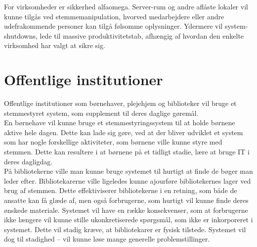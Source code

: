 For virksomheder er sikkerhed alfaomega. Server-rum og andre aflåste lokaler vil kunne tilgås ved stemmemanipulation, hvorved medarbejdere eller andre udefrakommende personer kan tilgå følsomme oplysninger. Ydermere vil system-shutdowns, lede til massive produktivitetstab, afhængig af hvordan den enkelte virksomhed har valgt at sikre sig. 

\section{Offentlige institutioner} 
Offentlige institutioner som børnehaver, plejehjem og biblioteker vil bruge et stemmestyret system, som supplement til deres daglige gøremål.\\ 

En børnehave vil kunne bruge et stemmestyringssystem til at holde børnene aktive hele dagen. Dette kan lade sig gøre, ved at der bliver udviklet et system som har nogle forskellige aktiviteter, som børnene ville kunne styre med stemmen. Dette kan resultere i at børnene på et tidligt stadie, lære at bruge IT i deres dagligdag. \\

På bibliotekerne ville man kunne bruge systemet til hurtigt at finde de bøger man leder efter. Bibliotekarerne ville ligeledes kunne ajourføre bibliotekernes lager ved brug af stemmen. Dette effektiviserer bibliotekerne i en retning, som både de ansatte kan få glæde af, men også forbrugerne, som hurtigt vil kunne finde deres ønskede materiale. Systemet vil have en række konsekvenser, som at forbrugerne ikke længere vil kunne stille ukonkretiserede spørgsmål, som ikke er inkorporeret i systemet. Dette vil stadig kræve, at bibliotekarer er fysisk tilstede. Systemet vil dog til stadighed – vil kunne løse mange generelle problemstillinger.

